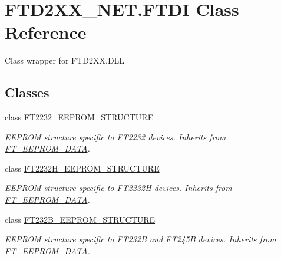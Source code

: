 \hypertarget{class_f_t_d2_x_x___n_e_t_1_1_f_t_d_i}{}\section{F\+T\+D2\+X\+X\+\_\+\+N\+E\+T.\+F\+T\+DI Class Reference}
\label{class_f_t_d2_x_x___n_e_t_1_1_f_t_d_i}


Class wrapper for F\+T\+D2\+X\+X.\+D\+LL  


\subsection*{Classes}
\begin{DoxyCompactItemize}
\item 
class \mbox{\hyperlink{class_f_t_d2_x_x___n_e_t_1_1_f_t_d_i_1_1_f_t2232___e_e_p_r_o_m___s_t_r_u_c_t_u_r_e}{F\+T2232\+\_\+\+E\+E\+P\+R\+O\+M\+\_\+\+S\+T\+R\+U\+C\+T\+U\+RE}}
\begin{DoxyCompactList}\small\item\em E\+E\+P\+R\+OM structure specific to F\+T2232 devices. Inherits from \mbox{\hyperlink{class_f_t_d2_x_x___n_e_t_1_1_f_t_d_i_1_1_f_t___e_e_p_r_o_m___d_a_t_a}{F\+T\+\_\+\+E\+E\+P\+R\+O\+M\+\_\+\+D\+A\+TA}}. \end{DoxyCompactList}\item 
class \mbox{\hyperlink{class_f_t_d2_x_x___n_e_t_1_1_f_t_d_i_1_1_f_t2232_h___e_e_p_r_o_m___s_t_r_u_c_t_u_r_e}{F\+T2232\+H\+\_\+\+E\+E\+P\+R\+O\+M\+\_\+\+S\+T\+R\+U\+C\+T\+U\+RE}}
\begin{DoxyCompactList}\small\item\em E\+E\+P\+R\+OM structure specific to F\+T2232H devices. Inherits from \mbox{\hyperlink{class_f_t_d2_x_x___n_e_t_1_1_f_t_d_i_1_1_f_t___e_e_p_r_o_m___d_a_t_a}{F\+T\+\_\+\+E\+E\+P\+R\+O\+M\+\_\+\+D\+A\+TA}}. \end{DoxyCompactList}\item 
class \mbox{\hyperlink{class_f_t_d2_x_x___n_e_t_1_1_f_t_d_i_1_1_f_t232_b___e_e_p_r_o_m___s_t_r_u_c_t_u_r_e}{F\+T232\+B\+\_\+\+E\+E\+P\+R\+O\+M\+\_\+\+S\+T\+R\+U\+C\+T\+U\+RE}}
\begin{DoxyCompactList}\small\item\em E\+E\+P\+R\+OM structure specific to F\+T232B and F\+T245B devices. Inherits from \mbox{\hyperlink{class_f_t_d2_x_x___n_e_t_1_1_f_t_d_i_1_1_f_t___e_e_p_r_o_m___d_a_t_a}{F\+T\+\_\+\+E\+E\+P\+R\+O\+M\+\_\+\+D\+A\+TA}}. \end{DoxyCompactList}\item 

\end{DoxyCompactItemize}
